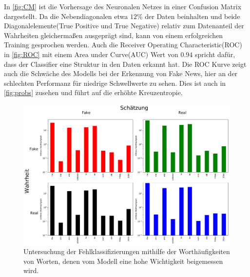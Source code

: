 In \autoref{fig:CM} ist die Vorhersage des Neuronalen Netzes in einer Confusion Matrix dargestellt. 
Da die Nebendiagonalen etwa $12\%$ der Daten beinhalten und beide Diagonalelemente(True Positive und True Negative) 
relativ zum Datenanteil der Wahrheiten gleichermaßen ausgeprägt sind, kann von einem erfolgreichen Training gesprochen 
werden.
Auch die Receiver Operating Characteristic(ROC) in \autoref{fig:ROC} mit einem Area under Curve(AUC) Wert von $0.94$ spricht dafür, dass 
der Classifier eine Struktur in den Daten erkannt hat.
Die ROC Kurve zeigt auch die Schwäche des Modells bei der Erkennung von Fake News, hier an der schlechten 
Performanz für niedrige Schwellwerte zu sehen.
Dies ist auch in \autoref{fig:probs} zusehen und führt auf die erhöhte Kreuzentropie.

\begin{figure}
    \centering
    \includegraphics[width=\textwidth]{pictures/cnfn_hist.pdf}
    \caption{Untersuchung der Fehlklassifizierungen mithilfe der Worthäufigkeiten von Worten, denen vom 
            Modell eine hohe Wichtigkeit beigemessen wird.}
    \label{fig:CM_i}
\end{figure}

